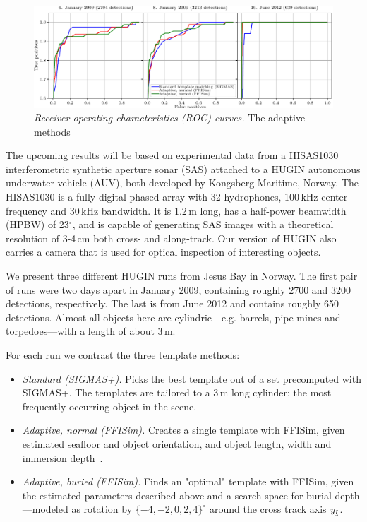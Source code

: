 \begin{figure}[t]\centering%
\includegraphics[width=\linewidth]{gfx/fig_rocs.pdf}%
\caption{\emph{Receiver operating characteristics (ROC) curves.} The adaptive methods }\label{IV_fig_roc_curves}%
\end{figure}

The upcoming results will be based on experimental data from a HISAS1030 interferometric synthetic aperture sonar (SAS) attached to a HUGIN autonomous underwater vehicle (AUV), both developed by Kongsberg Maritime, Norway. The HISAS1030 is a fully digital phased array with 32 hydrophones, 100\,kHz center frequency and 30\,kHz bandwidth. It is 1.2\,m long, has a half-power beamwidth (HPBW) of 23$^\circ$, and is capable of generating SAS images with a theoretical resolution of 3-4\,cm both cross- and along-track. Our version of HUGIN also carries a camera that is used for optical inspection of interesting objects.


We present three different HUGIN runs from Jesus Bay in Norway. The first pair of runs were two days apart in January 2009, containing roughly 2700 and 3200 detections, respectively. The last is from June 2012 and contains roughly 650 detections. Almost all objects here are cylindric---e.g. barrels, pipe mines and torpedoes---with a length of about 3\,m.

For each run we contrast the three template methods:
%
\begin{itemize}
\item \emph{Standard (SIGMAS+).} Picks the best template out of a set precomputed with SIGMAS+. The templates are tailored to a 3\,m long cylinder; the most frequently occurring object in the scene.
\item \emph{Adaptive, normal (FFISim).} Creates a single template with FFISim, given estimated seafloor and object orientation, and object length, width and immersion depth~\cite{Midelfart2010}. 
\item \emph{Adaptive, buried (FFISim).} Finds an "optimal" template with FFISim, given the estimated parameters described above and a search space for burial depth---modeled as rotation by $\{-4,-2,0,2,4\}^\circ$ around the cross track axis $y_\textrm{\tiny$\uvec{I}$}$.
\end{itemize}

